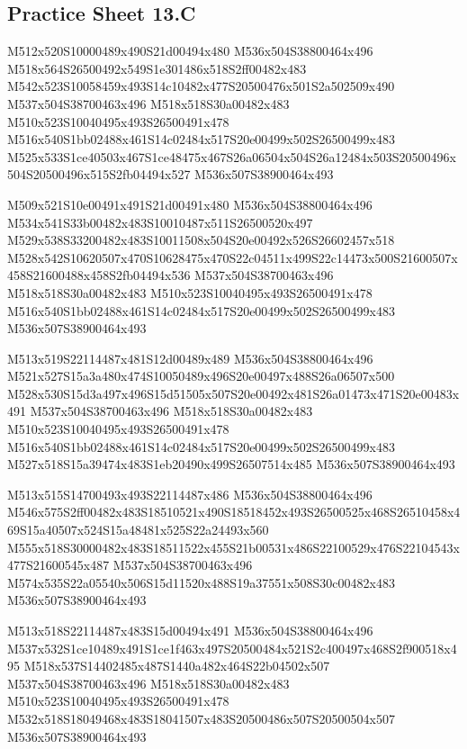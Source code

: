 \documentclass{article}
\begin{document}
\subsection{Practice Sheet 13.C}

\begin{multicols}{5}
\begin{center}

M512x520S10000489x490S21d00494x480 %
M536x504S38800464x496 %
M518x564S26500492x549S1e301486x518S2ff00482x483 %
M542x523S10058459x493S14c10482x477S20500476x501S2a502509x490 %
M537x504S38700463x496 %
M518x518S30a00482x483 %
M510x523S10040495x493S26500491x478 %
M516x540S1bb02488x461S14c02484x517S20e00499x502S26500499x483 %
M525x533S1ce40503x467S1ce48475x467S26a06504x504S26a12484x503S20500496x504S20500496x515S2fb04494x527 %
M536x507S38900464x493 %
\vfil
\columnbreak

M509x521S10e00491x491S21d00491x480 %
M536x504S38800464x496 %
M534x541S33b00482x483S10010487x511S26500520x497 %
M529x538S33200482x483S10011508x504S20e00492x526S26602457x518 %
M528x542S10620507x470S10628475x470S22c04511x499S22c14473x500S21600507x458S21600488x458S2fb04494x536 %
M537x504S38700463x496 %
M518x518S30a00482x483 %
M510x523S10040495x493S26500491x478 %
M516x540S1bb02488x461S14c02484x517S20e00499x502S26500499x483 %
M536x507S38900464x493 %
\vfil
\columnbreak

M513x519S22114487x481S12d00489x489 %
M536x504S38800464x496 %
M521x527S15a3a480x474S10050489x496S20e00497x488S26a06507x500 %
M528x530S15d3a497x496S15d51505x507S20e00492x481S26a01473x471S20e00483x491 %
M537x504S38700463x496 %
M518x518S30a00482x483 %
M510x523S10040495x493S26500491x478 %
M516x540S1bb02488x461S14c02484x517S20e00499x502S26500499x483 %
M527x518S15a39474x483S1eb20490x499S26507514x485 %
M536x507S38900464x493 %
\vfil
\columnbreak

M513x515S14700493x493S22114487x486 %
M536x504S38800464x496 %
M546x575S2ff00482x483S18510521x490S18518452x493S26500525x468S26510458x469S15a40507x524S15a48481x525S22a24493x560 %
M555x518S30000482x483S18511522x455S21b00531x486S22100529x476S22104543x477S21600545x487 %
M537x504S38700463x496 %
M574x535S22a05540x506S15d11520x488S19a37551x508S30c00482x483 %
M536x507S38900464x493 %
\vfil
\columnbreak

M513x518S22114487x483S15d00494x491 %
M536x504S38800464x496 %
M537x532S1ce10489x491S1ce1f463x497S20500484x521S2c400497x468S2f900518x495 %
M518x537S14402485x487S1440a482x464S22b04502x507 %
M537x504S38700463x496 %
M518x518S30a00482x483 %
M510x523S10040495x493S26500491x478 %
M532x518S18049468x483S18041507x483S20500486x507S20500504x507 %
M536x507S38900464x493 %
\vfil

\end{center}
\end{multicols}
\end{document}

